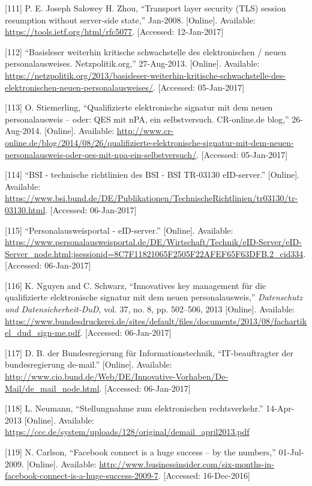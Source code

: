 \documentclass[12pt,english,a4paper,titlepage,cleardoublepage=empty,dottedtoc]{report}
\begin{document}
\hypertarget{ref-web_spec_tls-session-ticket-resumption}{}
{[}111{]} P. E. Joseph Salowey H. Zhou, ``Transport layer security (TLS)
session resumption without server-side state,'' Jan-2008. {[}Online{]}.
Available: \url{https://tools.ietf.org/html/rfc5077}. {[}Accessed:
12-Jan-2017{]}

\hypertarget{ref-web_2013_npa-sicherheitsdefizit}{}
{[}112{]} ``Basisleser weiterhin kritische schwachstelle des
elektronischen / neuen personalausweises. Netzpolitik.org,''
27-Aug-2013. {[}Online{]}. Available:
\url{https://netzpolitik.org/2013/basisleser-weiterhin-kritische-schwachstelle-des-elektronischen-neuen-personalausweises/}.
{[}Accessed: 05-Jan-2017{]}

\hypertarget{ref-web_2014_test-qes-support-in-npa}{}
{[}113{]} O. Stiemerling, ``Qualifizierte elektronische signatur mit dem
neuen personalausweis -- oder: QES mit nPA, ein selbstversuch.
CR-online.de blog,'' 26-Aug-2014. {[}Online{]}. Available:
\url{http://www.cr-online.de/blog/2014/08/26/qualifizierte-elektronische-signatur-mit-dem-neuen-personalausweis-oder-qes-mit-npa-ein-selbstversuch/}.
{[}Accessed: 05-Jan-2017{]}

\hypertarget{ref-web_bsi-spec_eid}{}
{[}114{]} ``BSI - technische richtlinien des BSI - BSI TR-03130
eID-server.'' {[}Online{]}. Available:
\url{https://www.bsi.bund.de/DE/Publikationen/TechnischeRichtlinien/tr03130/tr-03130.html}.
{[}Accessed: 06-Jan-2017{]}

\hypertarget{ref-web_2017_npa-eid-server}{}
{[}115{]} ``Personalausweisportal - eID-server.'' {[}Online{]}.
Available:
\url{https://www.personalausweisportal.de/DE/Wirtschaft/Technik/eID-Server/eID-Server_node.html;jsessionid=8C7F11821065F2505F22AFEF65F63DFB.2_cid334}.
{[}Accessed: 06-Jan-2017{]}

\hypertarget{ref-paper_2013-keymanangement-fuer-qes-mit-npa}{}
{[}116{]} K. Nguyen and C. Schwarz, ``Innovatives key management für die
qualifizierte elektronische signatur mit dem neuen personalausweis,''
\emph{Datenschutz und Datensicherheit-DuD}, vol. 37, no. 8, pp.
502--506, 2013 {[}Online{]}. Available:
\url{https://www.bundesdruckerei.de/sites/default/files/documents/2013/08/fachartikel_dud_sign-me.pdf}.
{[}Accessed: 06-Jan-2017{]}

\hypertarget{ref-web_2017_about-de-mail}{}
{[}117{]} D. B. der Bundesregierung für Informationstechnik,
``IT-beauftragter der bundesregierung de-mail.'' {[}Online{]}.
Available:
\url{http://www.cio.bund.de/Web/DE/Innovative-Vorhaben/De-Mail/de_mail_node.html}.
{[}Accessed: 06-Jan-2017{]}

\hypertarget{ref-statement_2013_de-mail}{}
{[}118{]} L. Neumann, ``Stellungnahme zum elektronischen
rechtsverkehr.'' 14-Apr-2013 {[}Online{]}. Available:
\url{https://ccc.de/system/uploads/128/original/demail_april2013.pdf}

\hypertarget{ref-web_2009-success-of-facebook-connect}{}
{[}119{]} N. Carlson, ``Facebook connect is a huge success -- by the
numbers,'' 01-Jul-2009. {[}Online{]}. Available:
\url{http://www.businessinsider.com/six-months-in-facebook-connect-is-a-huge-success-2009-7}.
{[}Accessed: 16-Dec-2016{]}
\end{document}
